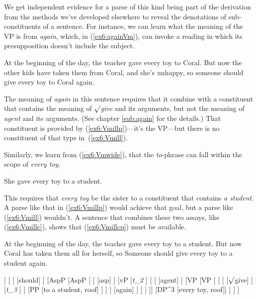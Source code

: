We get independent evidence for a parse of this kind being part of the derivation from the methods we've developed elsewhere to reveal the denotations of sub-constituents of a sentence. For instance, we can learn what the meaning of the VP is from \emph{again}, which, in (\ref{ex6:againVm}), can invoke a reading in which its presupposition doesn't include the subject.%
%
%
%
\begin{exe}
\raggedright
	\ex \label{ex6:againVm}
	At the beginning of the day, the teacher gave every toy to Coral. But now the other kids have taken them from Coral, and she's unhappy, so someone should give every toy to Coral again. 
\end{exe}
The meaning of \emph{again} in this sentence requires that it combine with a constituent that contains the meaning of \emph{$\surd$give} and its arguments, but not the meaning of \emph{agent} and its arguments. (See chapter \ref{sub:again} for the details.) That constituent is provided by (\ref{ex6:Vmillp})---it's the VP---but there is no constituent of that type in~(\ref{ex6:Vmill}).

Similarly, we learn from (\ref{ex6:Vmwide}), that the \emph{to}-phrase can fall within the scope of \emph{every toy}.
\begin{exe}
\raggedright
	\ex \label{ex6:Vmwide}
	She gave every toy to a student.
\end{exe}
This requires that \emph{every toy} be the sister to a constituent that contains \emph{a student}. A parse like that in (\ref{ex6:Vmillp}) would achieve that goal, but a parse like (\ref{ex6:Vmill}) wouldn't. A sentence that combines these two assays, like (\ref{ex6:Vmillc}), shows that (\ref{ex6:Vmillcp}) must be available.
\begin{exe}
\raggedright
	\sn At the beginning of the day, the teacher gave every toy to a student. But now Coral has taken them all for herself, so 
	\ex \label{ex6:Vmillc} Someone should give every toy to a student again.
	\ex \label{ex6:Vmillcp}%
	\small
	\begin{forest}
	[TP
		[DP^2 [someone, roof]]
		[ 
			[ ]
			[AspP 
			[AspP [
				[ [asp] ]
				[vP
					[\emph{t_2} ]
					[
						[ [agent] ]
						[VP
						[VP 
							[
							[
								[ [$\surd$give] ]
								[\emph{t_3} ]
							 ]
							[PP [to a student, roof] ]
						] ]
						[again]
						]
					 ]
				 ]
			]] 
			[DP^3 [every toy, roof]]
			]
		]
	]
	\end{forest}
\end{exe}

